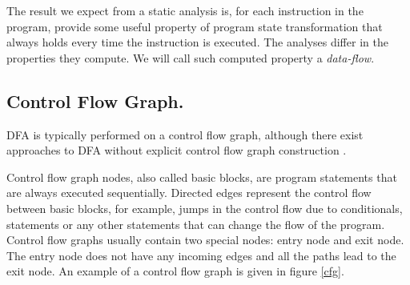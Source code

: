         The result we expect from a static analysis is, for each instruction 
        in the program, provide some useful property of program state transformation 
        that always holds every time the instruction is executed. 
        The analyses differ in the properties they compute. 
        We will call such computed property a \emph{data-flow}.
        
        
        \subsection{Control Flow Graph.} 
        DFA is typically performed on a control flow graph, 
        although there exist approaches to DFA 
        without explicit control flow graph 
        construction \cite{mohnen2002graph}.
        
        Control flow graph nodes, also called basic blocks, 
        are program statements that are always executed sequentially. 
        Directed edges represent the control flow between basic blocks, 
        for example, jumps in the control flow due to conditionals, 
         statements or any other statements that can change 
        the flow of the program.        
        Control flow graphs usually contain two special nodes: 
        entry node and exit node. The entry node does not have any 
        incoming edges and all the paths lead to the exit node.        
        An example of a control flow graph is given in figure \ref{cfg}.
        

